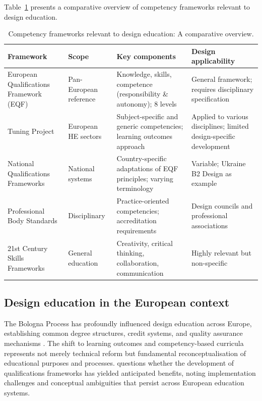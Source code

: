 \documentclass[ed]{acnsart}
\begin{document}
	Table~\ref{tab:competency-frameworks} presents a comparative overview of competency frameworks relevant to design education.
	
	\begin{table}[htbp]
		\centering
		\caption{Competency frameworks relevant to design education: A comparative overview.}
		\label{tab:competency-frameworks}
		\small
		\begin{tabularx}{\textwidth}{@{}p{3.2cm}p{2.5cm}Xp{3.6cm}@{}}
			\toprule
			\hfil \textbf{Framework} & \hfil \textbf{Scope} & \hfil \textbf{Key components} & \hfil \textbf{Design applicability} \\
			\midrule
			European Qualifications Framework (EQF) & Pan-European reference & Knowledge, skills, competence (responsibility \& autonomy); 8 levels & General framework; requires disciplinary specification \\
			\addlinespace
			Tuning Project & European HE sectors & Subject-specific and generic competencies; learning outcomes approach & Applied to various disciplines; limited design-specific development \\
			\addlinespace
			National Qualifications Frameworks & National systems & Country-specific adaptations of EQF principles; varying terminology & Variable; Ukraine B2 Design as example \\
			\addlinespace
			Professional Body Standards & Disciplinary & Practice-oriented competencies; accreditation requirements & Design councils and professional associations \\
			\addlinespace
			21st Century Skills Frameworks & General education & Creativity, critical thinking, collaboration, communication & Highly relevant but non-specific \\
			\bottomrule
		\end{tabularx}
	\end{table}
	
	\subsection{Design education in the European context}
	
	The Bologna Process has profoundly influenced design education across Europe, establishing common degree structures, credit systems, and quality assurance mechanisms \cite{Castillo2011230}. The shift to learning outcomes and competency-based curricula represents not merely technical reform but fundamental reconceptualisation of educational purposes and processes. \citet{Bohlinger2012279} questions whether the development of qualifications frameworks has yielded anticipated benefits, noting implementation challenges and conceptual ambiguities that persist across European education systems.
	
\end{document}
